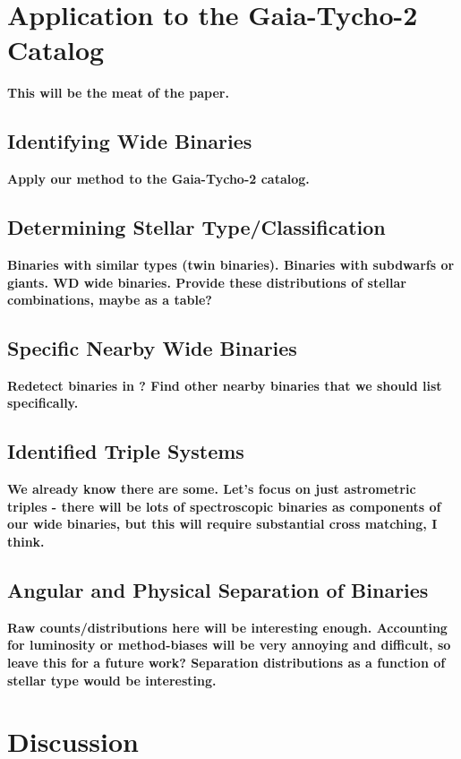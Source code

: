 \documentclass[usenatbib]{mnras}
\begin{document}
\section{Application to the Gaia-Tycho-2 Catalog}

{\bf This will be the meat of the paper.}

\subsection{Identifying Wide Binaries}
{\bf Apply our method to the Gaia-Tycho-2 catalog.}

\subsection{Determining Stellar Type/Classification}
{\bf Binaries with similar types (twin binaries). Binaries with subdwarfs or giants. WD wide binaries. Provide these distributions of stellar combinations, maybe as a table?}

\subsection{Specific Nearby Wide Binaries}
{\bf Redetect binaries in \citet{shaya11}? Find other nearby binaries that we should list specifically.}

\subsection{Identified Triple Systems} 
{\bf We already know there are some. Let's focus on just astrometric triples - there will be lots of spectroscopic binaries as components of our wide binaries, but this will require substantial cross matching, I think.}

\subsection{Angular and Physical Separation of Binaries}
{\bf Raw counts/distributions here will be interesting enough. Accounting for luminosity or method-biases will be very annoying and difficult, so leave this for a future work? Separation distributions as a function of stellar type would be interesting.}




\section{Discussion}
\end{document}
